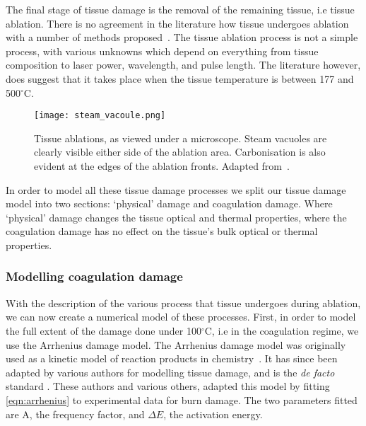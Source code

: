 The final stage of tissue damage is the removal of the remaining tissue, i.e tissue ablation. There is no agreement in the literature how tissue undergoes ablation with a number of methods proposed~\cite{vogel2003mechanisms,mckenzie1990physics}. The tissue ablation process is not a simple process, with various unknowns which depend on everything from tissue composition to laser power, wavelength, and pulse length. The literature however, does suggest that it takes place when the tissue temperature is between 177 and 500${^{\circ}}$C\cite{gerstmann1994char,mckenzie1986three,sagi1992heating}.

\begin{figure}	
\vspace{-10pt}
	\centering
	\texttt{[image: steam\_vacoule.png]}
	\caption{Tissue ablations, as viewed under a microscope. Steam vacuoles are clearly visible either side of the ablation area. Carbonisation is also evident at the edges of the ablation fronts. Adapted from~\cite{welch2011optical}.}
	\label{fig:histology}
	\vspace{-10pt}
\end{figure}

In order to model all these tissue damage processes we split our tissue damage model into two sections: `physical' damage and coagulation damage. Where `physical' damage changes the tissue optical and thermal properties, where the coagulation damage has no effect on the tissue's bulk optical or thermal properties.

\subsubsection{Modelling coagulation damage}\label{sec:coagdamage}
With the description of the various process that tissue undergoes during ablation, we can now create a numerical model of these processes.
First, in order to model the full extent of the damage done under 100${^{\circ}}$C, i.e in the coagulation regime, we use the Arrhenius damage model. The Arrhenius damage model was originally used as a kinetic model of reaction products in chemistry~\cite{pearce2009relationship}. It has since been adapted by various authors for modelling tissue damage, and is the \textit{de facto} standard \cite{hendriques1947studies,jiang2002effects}. These authors and various others, adapted this model by fitting \cref{eqn:arrhenius} to experimental data for burn damage. The two parameters fitted are A, the frequency factor, and $\Delta E$, the activation energy.


